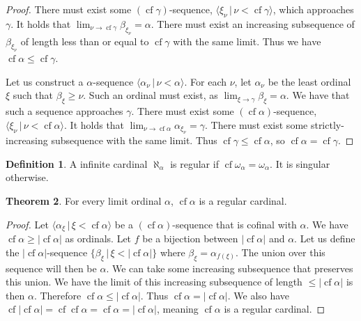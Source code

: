 \documentclass{article}
\theoremstyle{definition}
\newtheorem{thm}{Theorem}[section]
\newtheorem{defn}[thm]{Definition}
\DeclareMathOperator{\cf}{cf}
\newcommand{\abs}[1]{\lvert#1\rvert}
\begin{document}
\begin{proof}
    There must exist some $(\cf \gamma)$-sequence, $\langle \xi_\nu \, | \, \nu < \cf \gamma \rangle$, which approaches $\gamma$. It holds that $\lim_{\nu \to \cf \gamma} \beta_{\xi_\nu} = \alpha$. There must exist an increasing subsequence of $\beta_{\xi_\nu}$ of length less than or equal to $\cf \gamma$ with the same limit. Thus we have $\cf \alpha \le \cf \gamma$.

    Let us construct a $\alpha$-sequence $\langle \alpha_\nu \, | \, \nu < \alpha \rangle$. For each $\nu$, let $\alpha_\nu$ be the least ordinal $\xi$ such that $\beta_\xi \ge \nu$. Such an ordinal must exist, as $\lim_{\xi \to \gamma} \beta_\xi = \alpha$. We have that such a sequence approaches $\gamma$. There must exist some $(\cf \alpha)$-sequence, $\langle \xi_\nu \, | \, \nu < \cf \alpha \rangle$. It holds that $\lim_{\nu \to \cf \alpha} \alpha_{\xi_\nu} = \gamma$. There must exist some strictly-increasing subsequence with the same limit. Thus $\cf \gamma \le \cf \alpha$, so $\cf \alpha = \cf \gamma$.
\end{proof}

\begin{defn}
    A infinite cardinal $\aleph_\alpha$ is regular if $\cf \omega_\alpha = \omega_\alpha$. It is singular otherwise.
\end{defn}

\begin{thm}
    For every limit ordinal $\alpha$, $\cf \alpha$ is a regular cardinal. 
\end{thm}

\begin{proof}
    Let $\langle \alpha_\xi \, | \, \xi < \cf \alpha \rangle$ be a $(\cf \alpha)$-sequence that is cofinal with $\alpha$. We have $\cf \alpha \ge \abs{\cf \alpha}$ as ordinals. Let $f$ be a bijection between $\abs{\cf \alpha}$ and $\alpha$. Let us define the $\abs{\cf \alpha}$-sequence $\{\beta_\xi \, | \, \xi < \abs{\cf \alpha}\}$ where $\beta_\xi = \alpha_{f(\xi)}$. The union over this sequence will then be $\alpha$. We can take some increasing subsequence that preserves this union. We have the limit of this increasing subsequence of length $\le \abs{\cf \alpha}$ is then $\alpha$. Therefore $\cf \alpha \le \abs{\cf \alpha}$. Thus $\cf \alpha = \abs{\cf \alpha}$. We also have $\cf \abs{\cf \alpha} = \cf \cf \alpha = \cf \alpha = \abs{\cf \alpha}$, meaning $\cf \alpha$ is a regular cardinal.
\end{proof}
\end{document}

